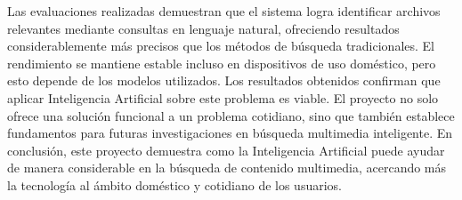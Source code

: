 Las evaluaciones realizadas demuestran que el sistema logra identificar archivos relevantes mediante consultas en lenguaje natural, ofreciendo resultados considerablemente más precisos que los métodos de búsqueda tradicionales. El rendimiento se mantiene estable incluso en dispositivos de uso doméstico, pero esto depende de los modelos utilizados.
Los resultados obtenidos confirman que aplicar Inteligencia Artificial sobre este problema es viable. El proyecto no solo ofrece una solución funcional a un problema cotidiano, sino que también establece fundamentos para futuras investigaciones en búsqueda multimedia inteligente.
En conclusión, este proyecto demuestra como la Inteligencia Artificial puede ayudar de manera considerable en la búsqueda de contenido multimedia, acercando más la tecnología al ámbito doméstico y cotidiano de los usuarios.
